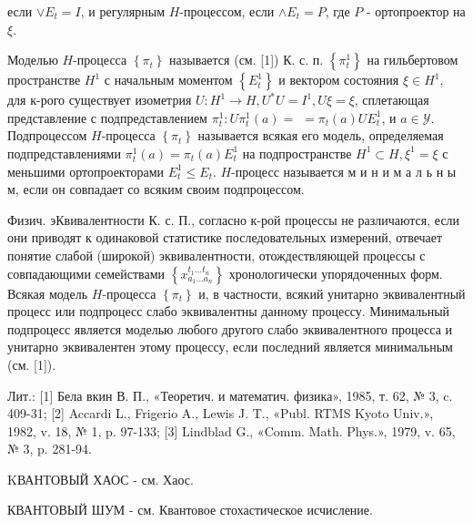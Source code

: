\documentclass[10pt]{article}
\begin{document}
если $\vee E_{t}=I$, и регулярным $H$-процессом, если $\wedge E_{t}=P$, где $P$ - ортопроектор на $\xi$.



Моделью $H$-процесса $\left\{\pi_{t}\right\}$ называется (см. [1]) К. с. п. $\left\{\pi_{t}^{1}\right\}$ на гильбертовом пространстве $H^{1}$ с начальным моментом $\left\{E_{t}^{1}\right\}$ и вектором состояния $\xi \in H^{1}$, для к-рого существует изометрия $U: H^{1} \rightarrow H, U^{*} U=I^{1}, U \xi=\xi$, сплетающая представление с подпредставлением $\pi_{t}^{1}: U \pi_{t}^{1}(a)=$ $=\pi_{t}(a) U E_{t}^{1}$, и $a \in \mathscr{Y}$. Подпроцессом $H$-процесса $\left\{\pi_{t}\right\}$ называется всякая его модель, определяемая подпредставлениями $\pi_{t}^{1}(a)=\pi_{t}(a) E_{t}^{1}$ на подпространстве $H^{1} \subset H, \xi^{1}=\xi$ с меньшими ортопроекторами $E_{t}^{1} \leqslant E_{t}$. $H$-процесс называется м и н и м а л ь н ы м, если он совпадает со всяким своим подпроцессом.



Физич. эКвивалентности К. с. П., согласно к-рой процессы не различаются, если они приводят к одинаковой статистике последовательных измерений, отвечает понятие слабой (широкой) эквивалентности, отождествляющей процессы с совпадающими семействами $\left\{x_{a_{1} \ldots a_{n}}^{t_{1} \ldots t_{n}}\right\}$ хронологически упорядоченных форм. Всякая модель $H$-процесса $\left\{\pi_{t}\right\}$ и, в частности, всякий унитарно эквивалентный процесс или подпроцесс слабо эквивалентны данному процессу. Минимальный подпроцесс является моделью любого другого слабо эквивалентного процесса и унитарно эквивалентен этому процессу, если последний является минимальным (см. [1]).



Лит.: [1] Бела вкин В. П., «Теоретич. и математич. физика», 1985, т. 62, № 3, c. 409-31; [2] Accardi L., Frigerio A., Lewis J. T., «Publ. RTMS Kyoto Univ.», 1982, v. 18, № 1, p. 97-133; [3] Lindblad G., «Comm. Math. Phys.», 1979, v. 65, № 3, p. 281-94.



KВАНТОВЫЙ ХАОС - см. Хаос.



КВАНТОВЫЙ ШУМ - см. Квантовое стохастическое исчисление.
\end{document}
